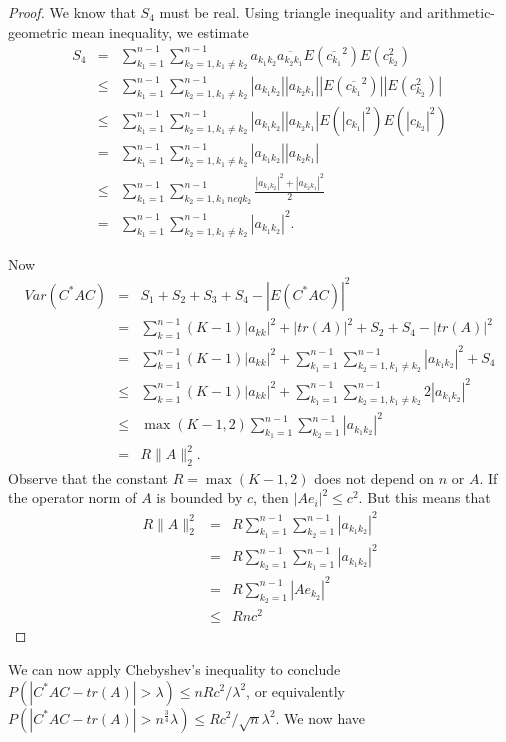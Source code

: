 \documentclass[12pt,a4paper,leqno]{report}
\theoremstyle{plain}
\theoremstyle{definition}
\theoremstyle{remark}
\begin{document}
\begin{proof}
We know that $S_4$ must be real. Using triangle inequality and arithmetic-geometric mean inequality, we estimate
\begin{eqnarray*}
S_4 & = & \sum_{k_1=1}^{n-1}\sum_{k_2=1, k_1 \neq k_2}^{n-1} a_{k_1k_2} \overline{a_{k_2k_1}}
E(\overline{c_{k_1}}^2) E( c_{k_2}^2)\\
& \leq & \sum_{k_1=1}^{n-1}\sum_{k_2=1, k_1 \neq k_2}^{n-1} |a_{k_1k_2}| |a_{k_2k_1}|
|E(\overline{c_{k_1}}^2)| |E( c_{k_2}^2)|\\
& \leq & \sum_{k_1=1}^{n-1}\sum_{k_2=1, k_1 \neq k_2}^{n-1} |a_{k_1k_2}| |a_{k_2k_1}|
E(|c_{k_1}|^2) E(|c_{k_2}|^2)\\
& = & \sum_{k_1=1}^{n-1}\sum_{k_2=1, k_1 \neq k_2}^{n-1} |a_{k_1k_2}| |a_{k_2k_1}|\\
& \leq & \sum_{k_1=1}^{n-1}\sum_{k_2=1, k_1 \ neq k_2}^{n-1} \frac{|a_{k_1k_2}|^2+|a_{k_2k_1}|^2}{2}\\
& = & \sum_{k_1=1}^{n-1}\sum_{k_2=1, k_1 \neq k_2}^{n-1} |a_{k_1k_2}|^2.
\end{eqnarray*}

Now
\begin{eqnarray*}
Var(C^* A C) & = & S_1+S_2+S_3+S_4 - |E(C^* A C)|^2\\
& = & \sum_{k=1}^{n-1} (K-1) |a_{kk}|^2 + |tr(A)|^2 + S_2+S_4 - |tr(A)|^2\\
& = &  \sum_{k=1}^{n-1} (K-1) |a_{kk}|^2 + \sum_{k_1=1}^{n-1} \sum_{k_2=1, k_1\neq k_2}^{n-1} |a_{k_1k_2}|^2+ S_4\\
& \leq & \sum_{k=1}^{n-1} (K-1) |a_{kk}|^2 + \sum_{k_1=1}^{n-1} \sum_{k_2=1, k_1\neq k_2}^{n-1} 2|a_{k_1k_2}|^2\\
& \leq & \max(K-1,2) \sum_{k_1=1}^{n-1} \sum_{k_2=1}^{n-1} |a_{k_1k_2}|^2\\
& = & R \|A\|_2^2. 
\end{eqnarray*}
Observe that the constant $R = \max(K-1,2)$ does not depend on $n$ or $A$. If the operator norm of $A$ is bounded by $c$, then $|Ae_i|^2\leq c^2$. But this means that
\begin{eqnarray*}
R \|A\|_2^2 & = & R \sum_{k_1=1}^{n-1} \sum_{k_2=1}^{n-1} |a_{k_1k_2}|^2\\
& = & R \sum_{k_2=1}^{n-1} \sum_{k_1=1}^{n-1} |a_{k_1k_2}|^2\\
& = & R \sum_{k_2=1}^{n-1} |Ae_{k_2}|^2\\
& \leq & R n c^2
\end{eqnarray*}
\end{proof}

We can now apply Chebyshev's inequality to conclude $P(|C^* A C - tr(A)|>\lambda) \leq nRc^2/\lambda^2$, or equivalently $P(|C^* A C - tr(A)|>n^{\frac{3}{4}}\lambda) \leq Rc^2/\sqrt{n}\lambda^2$. We now have
\end{document}
